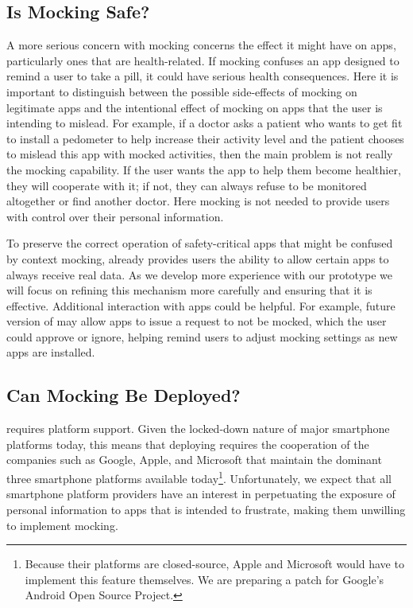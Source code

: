 \subsection{Is Mocking Safe?}

A more serious concern with mocking concerns the effect it might have on
apps, particularly ones that are health-related. If mocking confuses an app
designed to remind a user to take a pill, it could have serious health
consequences. Here it is important to distinguish between the possible
side-effects of mocking on legitimate apps and the intentional effect of
mocking on apps that the user is intending to mislead. For example, if a
doctor asks a patient who wants to get fit to install a pedometer to help
increase their activity level and the patient chooses to mislead this app
with mocked activities, then the main problem is not really the mocking
capability. If the user wants the app to help them become healthier, they
will cooperate with it; if not, they can always refuse to be monitored
altogether or find another doctor. Here mocking is not needed to provide
users with control over their personal information.

To preserve the correct operation of safety-critical apps that might be
confused by context mocking, \PocketMocker{} already provides users the
ability to allow certain apps to always receive real data. As we develop more
experience with our \PocketMocker{} prototype we will focus on refining this
mechanism more carefully and ensuring that it is effective. Additional
interaction with apps could be helpful. For example, future version of
\PocketMocker{} may allow apps to issue a request to not be mocked, which the
user could approve or ignore, helping remind users to adjust mocking settings
as new apps are installed.

\subsection{Can Mocking Be Deployed?}

\PocketMocker{} requires platform support. Given the locked-down nature of
major smartphone platforms today, this means that deploying
\PocketMocker{} requires the cooperation of the companies such as Google,
Apple, and Microsoft that maintain the dominant three smartphone platforms
available today\footnote{Because their platforms are closed-source, Apple and
Microsoft would have to implement this feature themselves. We are preparing a
patch for Google's Android Open Source Project.}. Unfortunately, we expect
that all smartphone platform providers have an interest in perpetuating the
exposure of personal information to apps that \PocketMocker{} is intended to
frustrate, making them unwilling to implement mocking. 

